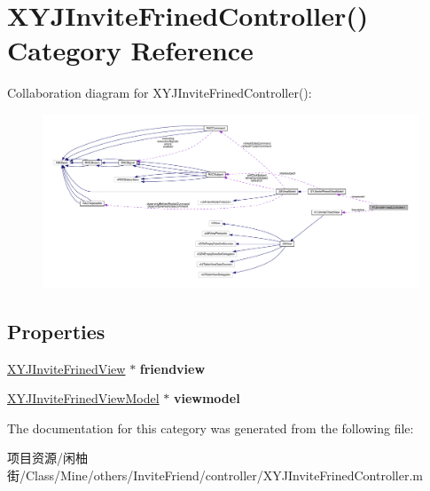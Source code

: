 \hypertarget{category_x_y_j_invite_frined_controller_07_08}{}\section{X\+Y\+J\+Invite\+Frined\+Controller() Category Reference}
\label{category_x_y_j_invite_frined_controller_07_08}


Collaboration diagram for X\+Y\+J\+Invite\+Frined\+Controller()\+:\nopagebreak
\begin{figure}[H]
\begin{center}
\leavevmode
\includegraphics[width=350pt]{category_x_y_j_invite_frined_controller_07_08__coll__graph}
\end{center}
\end{figure}
\subsection*{Properties}
\begin{DoxyCompactItemize}
\item 
\mbox{\label{category_x_y_j_invite_frined_controller_07_08_aa14884e871c05a629ba3676f7e3ab290}} 
\mbox{\hyperlink{interface_x_y_j_invite_frined_view}{X\+Y\+J\+Invite\+Frined\+View}} $\ast$ {\bfseries friendview}
\item 
\mbox{\label{category_x_y_j_invite_frined_controller_07_08_a0679a86b571ecb5638c00f20d9390c3c}} 
\mbox{\hyperlink{interface_x_y_j_invite_frined_view_model}{X\+Y\+J\+Invite\+Frined\+View\+Model}} $\ast$ {\bfseries viewmodel}
\end{DoxyCompactItemize}


The documentation for this category was generated from the following file\+:\begin{DoxyCompactItemize}
\item 
项目资源/闲柚街/\+Class/\+Mine/others/\+Invite\+Friend/controller/X\+Y\+J\+Invite\+Frined\+Controller.\+m\end{DoxyCompactItemize}
